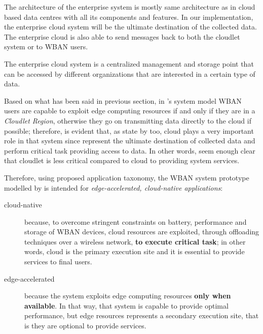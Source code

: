 \documentclass[sigchi]{acmart}
\begin{document}
\begin{quoting}[font=itshape, begintext={``}, endtext={''\cite[par.~3.2]{MSAReport}}]

The architecture of the enterprise system is mostly same architecture as in cloud based data centres with all its components and features. In our implementation, the enterprise cloud system will be the ultimate destination of the collected data. The enterprise cloud is also able to send messages back to both the cloudlet system or to WBAN users.

\end{quoting}

\vspace{0.3cm}

\begin{quoting}[font=itshape, begintext={``}, endtext={''\cite[par.~4.1]{MSAReport}}]

The enterprise cloud system is a centralized management and storage point that can be accessed by different organizations that are interested in a certain type of data. 

\end{quoting}

\vspace{0.3cm}

Based on what has been said in previous section, in \citet{MSAReport}'s system model WBAN users are capable to exploit edge computing resources if and only if they are in a \textit{Cloudlet Region}, otherwise they go on transmitting data directly to the cloud if possible; therefore, is evident that, as state by \citet{MSAReport} too, cloud plays a very important role in that system since represent the ultimate destination of collected data and perform critical task providing access to data. In other words, seem enough clear that cloudlet is less critical compared to cloud to providing system services.

Therefore, using \citet{EdgeNativeApplications} proposed application taxonomy, the WBAN system prototype modelled by \citet{MSAReport} is intended for \textit{edge-accelerated, cloud-native applications}:

\begin{description}

\item[cloud-native] because, to overcome stringent constraints on battery, performance and storage of WBAN devices, cloud resources are exploited, through offloading techniques over a wireless network, \textbf{to execute critical task}; in other words, cloud is the primary execution site and it is essential to provide services to final users.

\item[edge-accelerated] because the system exploits edge computing resources \textbf{only when available}. In that way, that system is capable to provide optimal performance, but edge resources represents a secondary execution site, that is they are optional to provide services.

\end{description}
\end{document}
